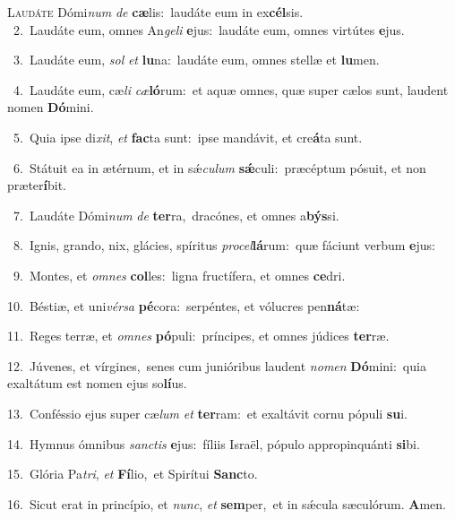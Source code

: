 \lettrine{\initial\textcolor{\initialcolor}{L}}{audáte} Dómi\textit{num} \textit{de} \textbf{cæ}\-lis:~\star laudáte eum in ex\-\textbf{cél}\-sis.\\
{\numbfont\textcolor{\numbcolor}{~2.}}~Laudáte eum, omnes An\-\textit{ge}\-\textit{li} \textbf{e}\-jus:~\star laudáte eum, omnes virtútes \textbf{e}\-jus.\par
{\numbfont\textcolor{\numbcolor}{~3.}}~Laudáte eum, \textit{sol} \textit{et} \textbf{lu}\-na:~\star laudáte eum, omnes stellæ et \textbf{lu}\-men.\par
{\numbfont\textcolor{\numbcolor}{~4.}}~Laudáte eum, cæ\textit{li} \textit{cæ}\-\textbf{ló}rum:~\star et aquæ omnes, quæ super cælos sunt, laudent nomen \textbf{Dó}\-mini.\par
{\numbfont\textcolor{\numbcolor}{~5.}}~Quia ipse di\-\textit{xit}\-, \textit{et} \textbf{fac}\-ta sunt:~\star ipse mandávit, et cre\-\textbf{á}\-ta sunt.\par
{\numbfont\textcolor{\numbcolor}{~6.}}~Státuit ea in ætérnum, et in sǽ\-\textit{cu}\-\textit{lum} \textbf{sǽ}\-culi:~\star præcéptum pósuit, et non præter\-\textbf{í}\-bit.\par
{\numbfont\textcolor{\numbcolor}{~7.}}~Laudáte Dómi\textit{num} \textit{de} \textbf{ter}\-ra,~\star dracónes, et omnes a\-\textbf{býs}\-si.\par
{\numbfont\textcolor{\numbcolor}{~8.}}~Ignis, grando, nix, glácies, spíritus \textit{pro}\-\textit{cel}\textbf{lá}rum:~\star quæ fáciunt verbum \textbf{e}\-jus:\par
{\numbfont\textcolor{\numbcolor}{~9.}}~Montes, et \textit{om}\-\textit{nes} \textbf{col}\-les:~\star ligna fructífera, et omnes \textbf{ce}\-dri.\par
{\numbfont\textcolor{\numbcolor}{10.}}~Béstiæ, et uni\-\textit{vér}\-\textit{sa} \textbf{pé}\-cora:~\star serpéntes, et vólucres pen\-\textbf{ná}\-tæ:\par
{\numbfont\textcolor{\numbcolor}{11.}}~Reges terræ, et \textit{om}\-\textit{nes} \textbf{pó}\-puli:~\star príncipes, et omnes júdices \textbf{ter}\-ræ.\par
{\numbfont\textcolor{\numbcolor}{12.}}~Júvenes, et vírgines,~\dagger senes cum junióribus laudent \textit{no}\-\textit{men} \textbf{Dó}\-mini:~\star quia exaltátum est nomen ejus so\-\textbf{lí}\-us.\par
{\numbfont\textcolor{\numbcolor}{13.}}~Conféssio ejus super cæ\textit{lum} \textit{et} \textbf{ter}\-ram:~\star et exaltávit cornu pópuli \textbf{su}\-i.\par
{\numbfont\textcolor{\numbcolor}{14.}}~Hymnus ómnibus \textit{sanc}\-\textit{tis} \textbf{e}\-jus:~\star fíliis Israël, pópulo appropinquánti \textbf{si}\-bi.\par
{\numbfont\textcolor{\numbcolor}{15.}}~Glória Pa\-\textit{tri}\-, \textit{et} \textbf{Fí}\-lio,~\star et Spirítui \textbf{Sanc}\-to.\par
{\numbfont\textcolor{\numbcolor}{16.}}~Sicut erat in princípio, et \textit{nunc}\-, \textit{et} \textbf{sem}\-per,~\star et in sǽcula sæculórum. \textbf{A}\-men.\par
